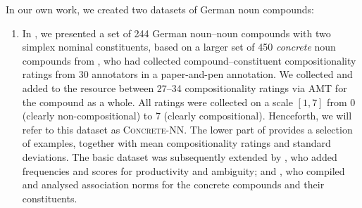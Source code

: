 \documentclass[output=paper,colorlinks,citecolor=brown]{langscibook}
\begin{document}
%
In our own work, we created two datasets of German noun compounds:
\begin{enumerate}[label=(\arabic*)] 
\item In \citet{SchulteImWaldeEtAl:13}, we presented a set of 244 German noun--noun compounds with two simplex nominal constituents, based on a larger set of 450 \textit{concrete} noun compounds from \citet{Heide/Borgwaldt:09}, who had collected compound--constituent compositionality ratings from 30 annotators in a paper-and-pen annotation. We collected and added to the resource between 27--34 compositionality ratings via AMT for the compound as a whole. All ratings were collected on a scale $[1,7]$ from 0 (clearly non-compositional) to 7 (clearly compositional). Henceforth, we will refer to this dataset as \textsc{Concrete-NN}. The lower part of  provides a selection of examples, together with mean compositionality ratings and standard deviations. The basic dataset was subsequently extended by \citet{SchulteImWaldeEtAl:16b}, who added frequencies and scores for productivity and ambiguity; and \citet{SchulteImWalde/Borgwaldt:15}, who compiled and analysed association norms for the concrete compounds and their constituents.
\end{enumerate}
\end{document}
